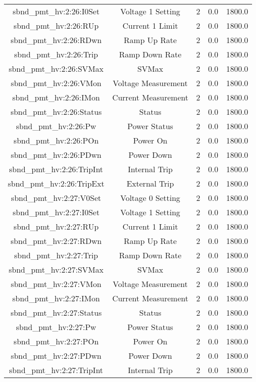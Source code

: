 \begin{table}[ptb]
\begin{tabular}{c | c c c c}
sbnd_pmt_hv:2:26:I0Set & Voltage 1 Setting & 2 & 0.0 & 1800.0\\ 
sbnd_pmt_hv:2:26:RUp & Current 1 Limit & 2 & 0.0 & 1800.0\\ 
sbnd_pmt_hv:2:26:RDwn & Ramp Up Rate & 2 & 0.0 & 1800.0\\ 
sbnd_pmt_hv:2:26:Trip & Ramp Down Rate & 2 & 0.0 & 1800.0\\ 
sbnd_pmt_hv:2:26:SVMax & SVMax & 2 & 0.0 & 1800.0\\ 
sbnd_pmt_hv:2:26:VMon & Voltage Measurement & 2 & 0.0 & 1800.0\\ 
sbnd_pmt_hv:2:26:IMon & Current Measurement & 2 & 0.0 & 1800.0\\ 
sbnd_pmt_hv:2:26:Status & Status & 2 & 0.0 & 1800.0\\ 
sbnd_pmt_hv:2:26:Pw & Power Status & 2 & 0.0 & 1800.0\\ 
sbnd_pmt_hv:2:26:POn & Power On & 2 & 0.0 & 1800.0\\ 
sbnd_pmt_hv:2:26:PDwn & Power Down & 2 & 0.0 & 1800.0\\ 
sbnd_pmt_hv:2:26:TripInt & Internal Trip & 2 & 0.0 & 1800.0\\ 
sbnd_pmt_hv:2:26:TripExt & External Trip & 2 & 0.0 & 1800.0\\ 
sbnd_pmt_hv:2:27:V0Set & Voltage 0 Setting & 2 & 0.0 & 1800.0\\ 
sbnd_pmt_hv:2:27:I0Set & Voltage 1 Setting & 2 & 0.0 & 1800.0\\ 
sbnd_pmt_hv:2:27:RUp & Current 1 Limit & 2 & 0.0 & 1800.0\\ 
sbnd_pmt_hv:2:27:RDwn & Ramp Up Rate & 2 & 0.0 & 1800.0\\ 
sbnd_pmt_hv:2:27:Trip & Ramp Down Rate & 2 & 0.0 & 1800.0\\ 
sbnd_pmt_hv:2:27:SVMax & SVMax & 2 & 0.0 & 1800.0\\ 
sbnd_pmt_hv:2:27:VMon & Voltage Measurement & 2 & 0.0 & 1800.0\\ 
sbnd_pmt_hv:2:27:IMon & Current Measurement & 2 & 0.0 & 1800.0\\ 
sbnd_pmt_hv:2:27:Status & Status & 2 & 0.0 & 1800.0\\ 
sbnd_pmt_hv:2:27:Pw & Power Status & 2 & 0.0 & 1800.0\\ 
sbnd_pmt_hv:2:27:POn & Power On & 2 & 0.0 & 1800.0\\ 
sbnd_pmt_hv:2:27:PDwn & Power Down & 2 & 0.0 & 1800.0\\ 
sbnd_pmt_hv:2:27:TripInt & Internal Trip & 2 & 0.0 & 1800.0\\ 

\end{tabular}
\end{table}
